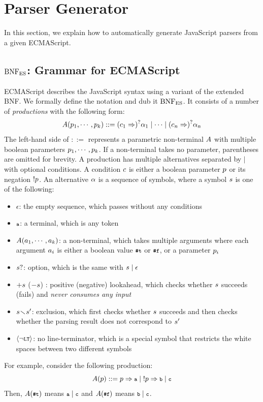 \section{Parser Generator}\label{sec:parser}
In this section, we explain how to automatically generate JavaScript
parsers from a given ECMAScript.

\subsection{\( \text{BNF}_{\text{ES}} \): Grammar for ECMAScript}
ECMAScript describes the JavaScript syntax using a variant of the extended BNF.
We formally define the notation and dub it \( \text{BNF}_{\text{ES}} \).  It consists of a
number of \textit{productions} with the following form:
\[
  A(p_1, \cdots, p_k) ::=
  (c_1 \Rightarrow)^? \alpha_1 \mid
  \cdots \mid
  (c_n \Rightarrow)^? \alpha_n
\]
The left-hand side of $::=$ represents a parametric non-terminal \( A \)
with multiple boolean parameters \( p_1, \cdots, p_k \).
If a non-terminal takes no parameter, parentheses are omitted for brevity.
A production has multiple alternatives separated by $\mid$ with optional conditions.
A condition \( c \) is either a boolean parameter \( p \)
or its negation \( ! p \).  An alternative \( \alpha \) is a sequence
of symbols, where a symbol \( s \) is one of the following:
\begin{itemize}%
\item \( \epsilon \): the empty sequence, which passes without any conditions
\item \( \texttt{\footnotesize a} \): a terminal, which is any token
\item \( A(a_1, \cdots, a_k) \): a non-terminal,
which takes multiple arguments where each argument \( a_i \) is
either a boolean value \( \texttt{\footnotesize\#t} \) or \( \texttt{\footnotesize\#f} \), or a parameter \( p_i \)
\item \( s? \): option, which is the same with \( s \mid \epsilon \)
\item \( +s \) (\( -s \)) : positive (negative) lookahead,
which checks whether \( s \) succeeds (fails) and
\textit{never consumes any input}
\item \( s \!\smallsetminus\! s' \): exclusion, which
first checks whether \( s \) succeeds
and then checks whether the parsing result does not correspond to \( s' \)
\item \( \left<\neg\texttt{\footnotesize LT}\right> \): no line-terminator, which is a special symbol
that restricts the white spaces between two different symbols
\end{itemize}
For example, consider the following production:
\[
  A(p) ::= p \Rightarrow \texttt{\footnotesize a}
  \mid \; !p \Rightarrow \texttt{\footnotesize b}
  \mid  \texttt{\footnotesize c}
\]
Then, \( A(\texttt{\footnotesize\#t}) \) means \( \texttt{\footnotesize a} \mid \texttt{\footnotesize c} \)
and \( A(\texttt{\footnotesize\#f}) \) means \( \texttt{\footnotesize b} \mid \texttt{\footnotesize c} \).

